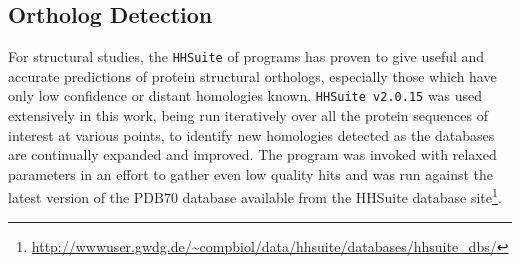 %
%
%
%
%
%
%
%
%
%

\subsection{Ortholog Detection}
For structural studies, the \texttt{HHSuite} of programs has proven to give useful and accurate predictions of protein structural orthologs, especially those which have only low confidence or distant homologies known. \texttt{HHSuite v2.0.15} \citep{Remmert2012, Soding2005} was used extensively in this work, being run iteratively over all the protein sequences of interest at various points, to identify new homologies detected as the databases are continually expanded and improved. The program was invoked with relaxed parameters in an effort to gather even low quality hits and was run against the latest version of the PDB70 database available from the HHSuite database site\footnote{\url{http://wwwuser.gwdg.de/~compbiol/data/hhsuite/databases/hhsuite_dbs/}}.


